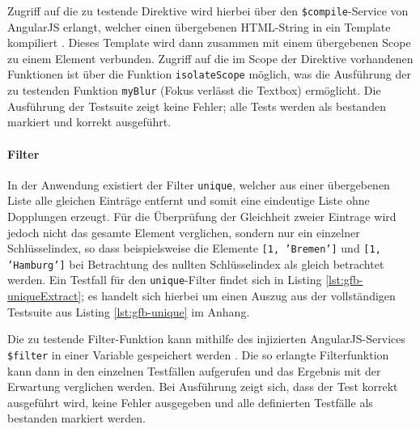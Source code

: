 \begin{figure}[H]
	
\end{figure}

Zugriff auf die zu testende Direktive wird hierbei über den \texttt{\$compile}-Service von AngularJS erlangt, welcher einen übergebenen HTML-String in ein Template kompiliert \cite{angular-compile}. Dieses Template wird dann zusammen mit einem übergebenen Scope zu einem Element verbunden. Zugriff auf die im Scope der Direktive vorhandenen Funktionen ist über die Funktion \texttt{isolateScope} möglich, was die Ausführung der zu testenden Funktion \texttt{myBlur} (Fokus verlässt die Textbox) ermöglicht. Die Ausführung der Testsuite zeigt keine Fehler; alle Tests werden als bestanden markiert und korrekt ausgeführt.

\paragraph{Filter}
In der Anwendung existiert der Filter \texttt{unique}, welcher aus einer übergebenen Liste alle gleichen Einträge entfernt und somit eine eindeutige Liste ohne Dopplungen erzeugt. Für die Überprüfung der Gleichheit zweier Eintrage wird jedoch nicht das gesamte Element verglichen, sondern nur ein einzelner Schlüsselindex, so dass beispielsweise die Elemente \texttt{[1, 'Bremen']} und \texttt{[1, 'Hamburg']} bei Betrachtung des nullten Schlüsselindex als gleich betrachtet werden. Ein Testfall für den \texttt{unique}-Filter findet sich in Listing \ref{lst:gfb-uniqueExtract}; es handelt sich hierbei um einen Auszug aus der vollständigen Testsuite aus Listing \ref{lst:gfb-unique} im Anhang.

\begin{figure}[H]
	
\end{figure}

Die zu testende Filter-Funktion kann mithilfe des injizierten AngularJS-Services \texttt{\$filter} in einer Variable gespeichert werden  \cite{angular-filter}. Die so erlangte Filterfunktion kann dann in den einzelnen Testfällen aufgerufen und das Ergebnis mit der Erwartung verglichen werden. Bei Ausführung zeigt sich, dass der Test korrekt ausgeführt wird, keine Fehler ausgegeben und alle definierten Testfälle als bestanden markiert werden.

